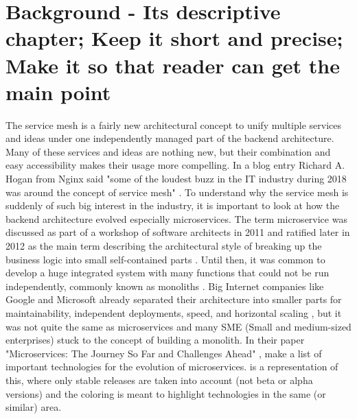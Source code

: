 \section{Background - Its descriptive chapter;  Keep it short and precise; Make it so that reader can get the main point}
The service mesh is a fairly new architectural concept to unify multiple services and ideas under one independently managed part of the backend architecture. Many of these services and ideas are nothing new, but their combination and easy accessibility makes their usage more compelling. In a blog entry Richard A. Hogan from Nginx said "some of the loudest buzz in the IT industry during 2018 was around the concept of service mesh" \citep{nginx-service-mesh}. To understand why the service mesh is suddenly of such big interest in the industry, it is important to look at how the backend architecture evolved especially microservices. The term microservice was discussed as part of a workshop of software architects in 2011 and ratified later in 2012 as the main term describing the architectural style of breaking up the business logic into small self-contained parts \citep{fowler2014microservices}. Until then, it was common to develop a huge integrated system with many functions that could not be run independently, commonly known as monoliths \citep{dragoni2017microservices}. Big Internet companies like Google and Microsoft already separated their architecture into smaller parts for maintainability, independent deployments, speed, and horizontal scaling \citep{micro-at-google}, but it was not quite the same as microservices and many SME (Small and medium-sized enterprises) stuck to the concept of building a monolith.  In their paper "Microservices: The Journey So Far and Challenges Ahead" \cite{jamshidi2018microservices}, make a list of important technologies for the evolution of microservices.  is a representation of this, where only stable releases are taken into account (not beta or alpha versions) and the coloring is meant to highlight technologies in the same (or similar) area.
